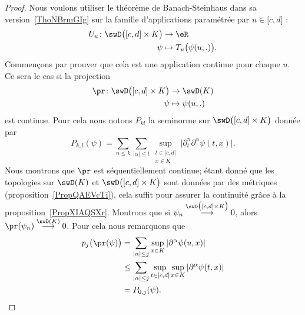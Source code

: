 \begin{proof}
    Nous voulons utiliser le théorème de Banach-Steinhaus dans sa version~\ref{ThoNBrmGIg} sur la famille d'applications paramétrée par \( u\in\mathopen[ c , d \mathclose]\) :
    \begin{equation}        \label{EqBEKoqMb}
        \begin{aligned}
            U_u\colon \swD\big( \mathopen[ c , d \mathclose]\times K \big)&\to \eR \\
            \psi&\mapsto T_u\big( \psi(u,.) \big).
        \end{aligned}
    \end{equation}
    Commençons par prouver que cela est une application continue pour chaque \( u\). Ce sera le cas si la projection
    \begin{equation}
        \begin{aligned}
            \pr\colon \swD\big( \mathopen[ c , d \mathclose]\times K \big)&\to \swD(K) \\
            \psi&\mapsto \psi(u,.)
        \end{aligned}
    \end{equation}
    est continue. Pour cela nous notons \( P_{kl}\) la seminorme sur \( \swD\big( \mathopen[ c , d \mathclose]\times K \big)\) donnée par
    \begin{equation}
        P_{k,l}(\psi)=\sum_{n\leq k}\sum_{| \alpha |\leq l}\sup_{\substack{t\in\mathopen[ c , d \mathclose]\\x\in K}}\big| \partial_t^n\partial^{\alpha}\psi(t,x) \big|.
    \end{equation}
    Nous montrons que \( \pr\) est séquentiellement continue; étant donné que les topologies sur \( \swD(K)\) et \( \swD\big( \mathopen[ c , d \mathclose]\times K \big)\) sont données par des métriques (proposition~\ref{PropQAEVcTi}), cela suffit pour assurer la continuité grâce à la proposition~\ref{PropXIAQSXr}. Montrons que si \( \psi_n\stackrel{\swD\big( \mathopen[ c , d \mathclose]\times K \big)}{\longrightarrow}0\), alors \( \pr(\psi_n)\stackrel{\swD(K)}{\longrightarrow}0\). Pour cela nous remarquons que
    \begin{subequations}
        \begin{align}
            p_j\big( \pr(\psi) \big)&=\sum_{| \alpha |\leq j}\sup_{x\in K}| \partial^{\alpha}\psi(u,x) |\\
            &\leq \sum_{| \alpha |\leq j}\sup_{t\in\mathopen[ c , d \mathclose]}\sup_{x\in K}| \partial^{\alpha}\psi(t,x) |\\
            &=P_{0,j}(\psi).

\end{align}
\end{subequations}
\end{proof}
